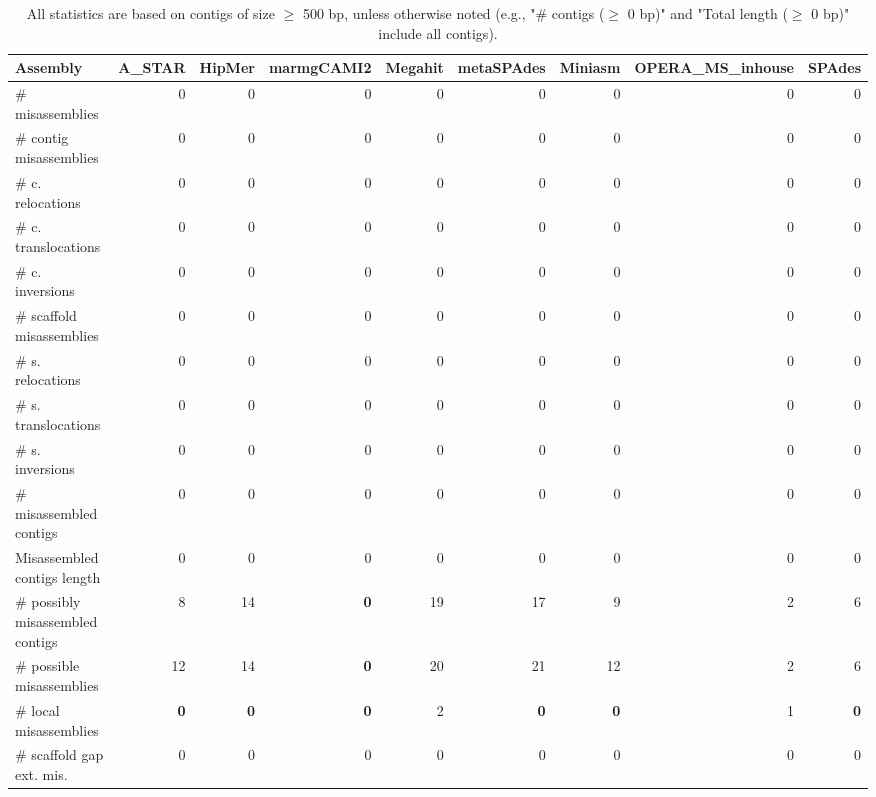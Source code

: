 \documentclass[12pt,a4paper]{article}
\begin{document}
\begin{table}[ht]
\begin{center}
\caption{All statistics are based on contigs of size $\geq$ 500 bp, unless otherwise noted (e.g., "\# contigs ($\geq$ 0 bp)" and "Total length ($\geq$ 0 bp)" include all contigs).}
\begin{tabular}{|l*{8}{|r}|}
\hline
Assembly & A\_STAR & HipMer & marmgCAMI2 & Megahit & metaSPAdes & Miniasm & OPERA\_MS\_inhouse & SPAdes \\ \hline
\# misassemblies & 0 & 0 & 0 & 0 & 0 & 0 & 0 & 0 \\ \hline
\hspace{2mm}\# contig misassemblies & 0 & 0 & 0 & 0 & 0 & 0 & 0 & 0 \\ \hline
\hspace{5mm}\# c. relocations & 0 & 0 & 0 & 0 & 0 & 0 & 0 & 0 \\ \hline
\hspace{5mm}\# c. translocations & 0 & 0 & 0 & 0 & 0 & 0 & 0 & 0 \\ \hline
\hspace{5mm}\# c. inversions & 0 & 0 & 0 & 0 & 0 & 0 & 0 & 0 \\ \hline
\hspace{2mm}\# scaffold misassemblies & 0 & 0 & 0 & 0 & 0 & 0 & 0 & 0 \\ \hline
\hspace{5mm}\# s. relocations & 0 & 0 & 0 & 0 & 0 & 0 & 0 & 0 \\ \hline
\hspace{5mm}\# s. translocations & 0 & 0 & 0 & 0 & 0 & 0 & 0 & 0 \\ \hline
\hspace{5mm}\# s. inversions & 0 & 0 & 0 & 0 & 0 & 0 & 0 & 0 \\ \hline
\# misassembled contigs & 0 & 0 & 0 & 0 & 0 & 0 & 0 & 0 \\ \hline
Misassembled contigs length & 0 & 0 & 0 & 0 & 0 & 0 & 0 & 0 \\ \hline
\# possibly misassembled contigs & 8 & 14 & {\bf 0} & 19 & 17 & 9 & 2 & 6 \\ \hline
\hspace{5mm}\# possible misassemblies & 12 & 14 & {\bf 0} & 20 & 21 & 12 & 2 & 6 \\ \hline
\# local misassemblies & {\bf 0} & {\bf 0} & {\bf 0} & 2 & {\bf 0} & {\bf 0} & 1 & {\bf 0} \\ \hline
\# scaffold gap ext. mis. & 0 & 0 & 0 & 0 & 0 & 0 & 0 & 0 \\ \hline

\end{tabular}
\end{center}
\end{table}
\end{document}
